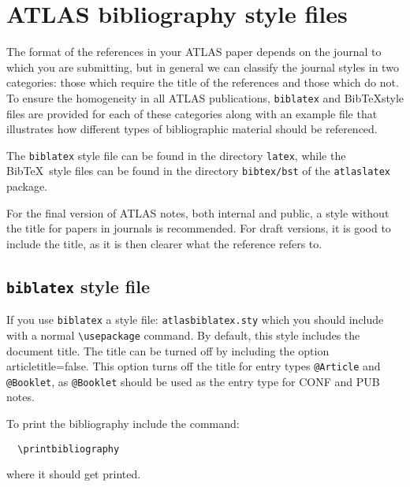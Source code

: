 \documentclass[UKenglish]{latex/atlasdoc}
\newcommand*{\BibTeX}{Bib\TeX}
\newcommand{\File}[1]{\texttt{#1}\xspace}
\newcommand{\Macro}[1]{\texttt{\textbackslash #1}\xspace}
\newcommand{\Option}[1]{\textsf{#1}\xspace}
\newcommand{\Package}[1]{\texttt{#1}\xspace}
\begin{document}
\section{ATLAS bibliography style files}
\label{sec:atlasbst}

The format of the references in your ATLAS paper depends on the journal to which you are submitting,
but in general we can classify the journal styles in two categories: 
those which require the title of the references and those which do not. 
To ensure the homogeneity in all ATLAS publications, 
\Package{biblatex} and \BibTeX style files are provided for each of these categories 
along with an example file that illustrates how different types of bibliographic material should be referenced.

The \Package{biblatex} style file can be found in the directory \File{latex},
while the \BibTeX\ style files can be found in the directory \File{bibtex/bst} of the \Package{atlaslatex} package.

For the final version of ATLAS notes, both internal and public, a style without the title for papers in journals is recommended.
For draft versions, it is good to include the title, as it is then clearer what the reference refers to.


\subsection{\Package{biblatex} style file}

If you use \Package{biblatex} a style file: \Package{atlasbiblatex.sty}
which you should include with a normal \Macro{usepackage} command.
By default, this style includes the document title.
The title can be turned off by including the option \Option{articletitle=false}.
This option turns off the title for entry types \texttt{@Article} and \texttt{@Booklet},
as \texttt{@Booklet} should be used as the entry type for CONF and PUB notes.

To print the bibliography include the command:
%
\begin{verbatim}
  \printbibliography
\end{verbatim}
%
where it should get printed.
\end{document}
